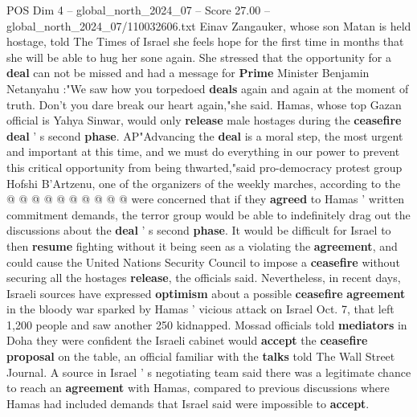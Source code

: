 \begin{textsample}{POS Dim 4 – global\_north\_2024\_07 – Score 27.00 – global\_north\_2024\_07/110032606.txt}
Einav Zangauker, whose son Matan is held hostage, told The Times of Israel she feels hope for the first time in months that she will be able to hug her sone again.
She stressed that the opportunity for a \textbf{deal} can not be missed and had a message for \textbf{Prime} Minister Benjamin Netanyahu :"We saw how you torpedoed \textbf{deals} again and again at the moment of truth.
Don't you dare break our heart again,"she said.
Hamas, whose top Gazan official is Yahya Sinwar, would only \textbf{release} male hostages during the \textbf{ceasefire} \textbf{deal} ' s second \textbf{phase}.
AP"Advancing the \textbf{deal} is a moral step, the most urgent and important at this time, and we must do everything in our power to prevent this critical opportunity from being thwarted,"said pro-democracy protest group Hofshi B'Artzenu, one of the organizers of the weekly marches, according to the @ @ @ @ @ @ @ @ @ @ were concerned that if they \textbf{agreed} to Hamas ' written commitment demands, the terror group would be able to indefinitely drag out the discussions about the \textbf{deal} ' s second \textbf{phase}.
It would be difficult for Israel to then \textbf{resume} fighting without it being seen as a violating the \textbf{agreement}, and could cause the United Nations Security Council to impose a \textbf{ceasefire} without securing all the hostages \textbf{release}, the officials said.
Nevertheless, in recent days, Israeli sources have expressed \textbf{optimism} about a possible \textbf{ceasefire} \textbf{agreement} in the bloody war sparked by Hamas ' vicious attack on Israel Oct. 7, that left 1,200 people and saw another 250 kidnapped.
Mossad officials told \textbf{mediators} in Doha they were confident the Israeli cabinet would \textbf{accept} the \textbf{ceasefire} \textbf{proposal} on the table, an official familiar with the \textbf{talks} told The Wall Street Journal.
A source in Israel ' s negotiating team said there was a legitimate chance to reach an \textbf{agreement} with Hamas, compared to previous discussions where Hamas had included demands that Israel said were impossible to \textbf{accept}.

\end{textsample}
